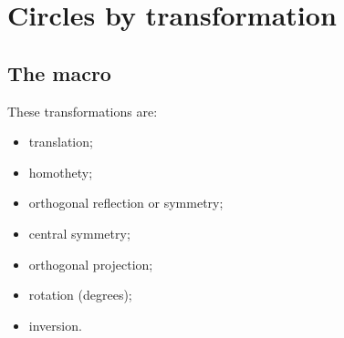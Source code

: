 \section{Circles by transformation}
\subsection{The macro }
These transformations are:

\begin{itemize}
   \item translation;
   \item homothety;
   \item orthogonal reflection or symmetry;
   \item central symmetry;
   \item orthogonal projection;
   \item rotation (degrees);
   \item inversion.
\end{itemize}

